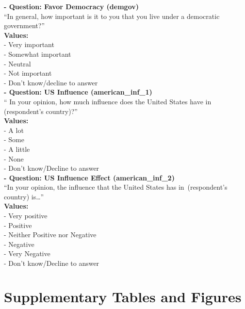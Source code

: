 \documentclass[12pt]{article}
\begin{document}
\noindent\textbf{  - Question: Favor Democracy (demgov)} \\
``In general, how important is it to you that you live under a democratic government?''\\
\textbf{Values:}\\
 - Very important\\
 - Somewhat important\\
 - Neutral\\
 - Not important\\
 - Don’t know/decline to answer\\



\noindent\textbf{  - Question: US Influence (american\_inf\_1)} \\
`` In your opinion, how much influence does the United States have in (respondent's country)?''\\
\textbf{Values:}\\
 - A lot\\
 - Some\\
 - A little\\
 - None\\
 - Don’t know/Decline to answer\\


\noindent\textbf{  - Question: US Influence Effect (american\_inf\_2)} \\
``In your opinion, the influence that the United States has in (respondent's country) is\ldots''\\
\textbf{Values:}\\
 - Very positive\\
 - Positive\\
 - Neither Positive nor Negative\\
 - Negative\\
 - Very Negative\\
 - Don’t know/Decline to answer\\


\clearpage
\pagestyle{empty}

\section{Supplementary Tables and Figures}
\end{document}
